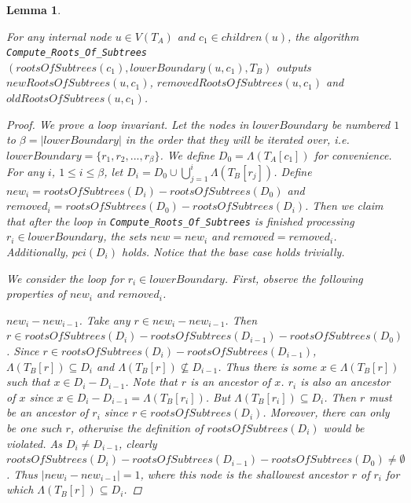 \documentclass{article}
\newcommand{\leafset}{\Lambda}
\newtheorem{computerootsofsubtreescorrectness}[incompatibility]{Lemma}
\begin{document}
    \bigskip
    \begin{computerootsofsubtreescorrectness}
        \label{lem:computerootsofsubtreescorrectness}

        For any internal node $u \in V(T_A)$ and $c_1 \in children(u)$, the algorithm\\ %
        \texttt{Compute\_Roots\_Of\_Subtrees}$(rootsOfSubtrees(c_1), lowerBoundary(u, c_1), T_B)$ outputs $newRootsOfSubtrees(u, c_1)$, $removedRootsOfSubtrees(u, c_1)$ and $oldRootsOfSubtrees(u, c_1)$.

        \begin{proof}
            We prove a loop invariant. Let the nodes in $lowerBoundary$ be numbered $1$ to $\beta = |lowerBoundary|$ in the order that they will be iterated over, i.e. $lowerBoundary = \{r_1, r_2, ..., r_{\beta}\}$. We define $D_0 = \leafset(T_A[c_1])$ for convenience. For any $i$, $1 \leq i \leq \beta$, let $D_i = D_0 \cup \bigcup_{j = 1}^{i} \leafset(T_B[r_j])$. Define $new_i = rootsOfSubtrees(D_i) - rootsOfSubtrees(D_0)$ and $removed_i = rootsOfSubtrees(D_0) - rootsOfSubtrees(D_i)$. Then we claim that after the loop in \texttt{Compute\_Roots\_Of\_Subtrees} is finished processing $r_i \in lowerBoundary$, the sets $new = new_i$ and $removed = removed_i$. Additionally, $pci(D_i)$ holds. Notice that the base case holds trivially.

            We consider the loop for $r_i \in lowerBoundary$. First, observe the following properties of $new_i$ and $removed_i$.

            \textit{$new_i - new_{i-1}$.} Take any $r \in new_i - new_{i-1}$. Then $r \in rootsOfSubtrees(D_i) - rootsOfSubtrees(D_{i-1}) - rootsOfSubtrees(D_0)$. Since $r \in rootsOfSubtrees(D_i) - rootsOfSubtrees(D_{i-1})$, $\leafset(T_B[r]) \subseteq D_i$ and $\leafset(T_B[r]) \not\subseteq D_{i-1}$. Thus there is some $x \in \leafset(T_B[r])$ such that $x \in D_i - D_{i-1}$. Note that $r$ is an ancestor of $x$. $r_i$ is also an ancestor of $x$ since $x \in D_i - D_{i-1} = \leafset(T_B[r_i])$. But $\leafset(T_B[r_i]) \subseteq D_i$. Then $r$ must be an ancestor of $r_i$ since $r \in rootsOfSubtrees(D_i)$. Moreover, there can only be one such $r$, otherwise the definition of $rootsOfSubtrees(D_i)$ would be violated. As $D_i \neq D_{i-1}$, clearly $rootsOfSubtrees(D_i) - rootsOfSubtrees(D_{i-1}) - rootsOfSubtrees(D_0) \neq \emptyset$. Thus $|new_i - new_{i-1}| = 1$, where this node is the shallowest ancestor $r$ of $r_i$ for which $\leafset(T_B[r]) \subseteq D_i$.


\end{proof}
\end{computerootsofsubtreescorrectness}
\end{document}
